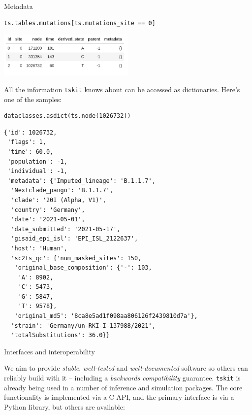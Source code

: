 \documentclass[landscape,a0paper,fontscale=0.4]{baposter}
\newcommand{\tskit}{{\texttt{tskit}}}
\begin{document}
\begin{poster}
\begin{posterbox}[name=inout,column=0,span=1]{Metadata}
\begin{multicols}{2}
\begin{verbatim}
ts.tables.mutations[ts.mutations_site == 0]
\end{verbatim}
\includegraphics[width=0.5\textwidth]{sc2_muts}
\end{multicols}

All the information \tskit{} knows about can be accessed
as dictionaries.
Here's one of the samples:

\tiny
\begin{verbatim}
dataclasses.asdict(ts.node(1026732))
\end{verbatim}
\tiny
\begin{verbatim}
{'id': 1026732,
 'flags': 1,
 'time': 60.0,
 'population': -1,
 'individual': -1,
 'metadata': {'Imputed_lineage': 'B.1.1.7',
  'Nextclade_pango': 'B.1.1.7',
  'clade': '20I (Alpha, V1)',
  'country': 'Germany',
  'date': '2021-05-01',
  'date_submitted': '2021-05-17',
  'gisaid_epi_isl': 'EPI_ISL_2122637',
  'host': 'Human',
  'sc2ts_qc': {'num_masked_sites': 150,
   'original_base_composition': {'-': 103,
    'A': 8902,
    'C': 5473,
    'G': 5847,
    'T': 9578},
   'original_md5': '8ca8e5ad1f098aa806126f2439810d7a'},
  'strain': 'Germany/un-RKI-I-137988/2021',
  'totalSubstitutions': 36.0}}
\end{verbatim}

\end{posterbox}

\begin{posterbox}[name=interop,column=0,row=0,span=2,below=inout]{Interfaces and interoperability}

\begin{multicols}{2}

We aim to provide \emph{stable}, \emph{well-tested} and \emph{well-documented}
software so others can reliably build with it --
including a \emph{backwards compatibility} guarantee.
\tskit{} is already being used in a number of inference and simulation packages.
The core functionality is implemented via a C API,
and the primary interface is via a Python library,
but others are available:


\end{multicols}
\end{posterbox}
\end{poster}
\end{document}
